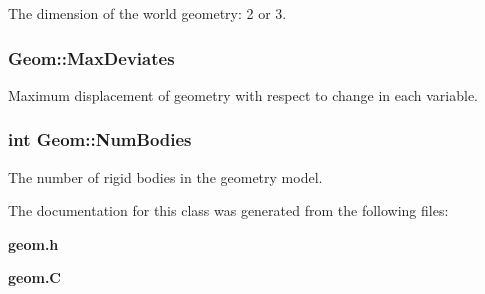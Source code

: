 The dimension of the world geometry: 2 or 3.

\subsubsection{ Geom::Max\-Deviates}\label{classGeom_m2}


Maximum displacement of geometry with respect to change in each variable.

\subsubsection{\setlength{\rightskip}{0pt plus 5cm}int Geom::Num\-Bodies}\label{classGeom_m0}


The number of rigid bodies in the geometry model.



The documentation for this class was generated from the following files:\begin{CompactItemize}
\item 
{\bf geom.h}\item 
{\bf geom.C}\end{CompactItemize}
